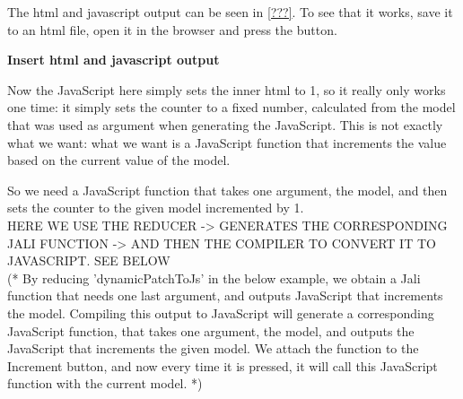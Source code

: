 The html and javascript output can be seen in \ref{???}. To see that it works, save it to an html file, open it in the browser and press the button.

\textbf{Insert html and javascript output}

Now the JavaScript here simply sets the inner html to 1, so it really only works one time: it simply sets the counter to a fixed number, calculated from the model that was used as argument when generating the JavaScript. This is not exactly what we want: what we want is a JavaScript function that increments the value based on the current value of the model. 


So we need a JavaScript function that takes one argument, the model, and then sets the counter to the given model incremented by 1.\\
HERE WE USE THE REDUCER -> GENERATES THE CORRESPONDING JALI FUNCTION -> AND THEN THE COMPILER TO CONVERT IT TO JAVASCRIPT. SEE BELOW\\
(* By reducing 'dynamicPatchToJs' in the below example, we obtain a Jali function that needs one last argument, and outputs JavaScript that increments the model. Compiling this output to JavaScript will generate a corresponding JavaScript function, that takes one argument, the model, and outputs the JavaScript that increments the given model. We attach the function to the Increment button, and now every time it is pressed, it will call this JavaScript function with the current model. *)
